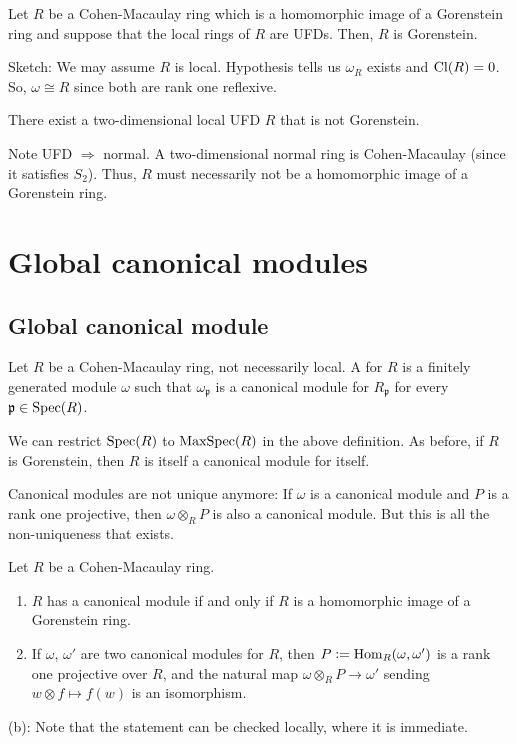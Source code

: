 \documentclass[12pt]{article}
\begin{document}
\begin{thm}[Murthy]
	Let $R$ be a Cohen-Macaulay ring which is a homomorphic image of a Gorenstein ring and suppose that the local rings of $R$ are UFDs. Then, $R$ is Gorenstein.
\end{thm}
Sketch: We may assume $R$ is local. Hypothesis tells us $\omega_{R}$ exists and $\operatorname{Cl}(R) = 0$. So, $\omega \cong R$ since both are rank one reflexive. 

\begin{rem}
	There exist a two-dimensional local UFD $R$ that is not Gorenstein. 

	Note UFD $\Rightarrow$ normal. A two-dimensional normal ring is Cohen-Macaulay (since it satisfies $S_{2}$). Thus, $R$ must necessarily not be a homomorphic image of a Gorenstein ring.
\end{rem}

\section{Global canonical modules}

\subsection{Global canonical module}
\begin{defn}
	Let $R$ be a Cohen-Macaulay ring, not necessarily local. A  for $R$ is a finitely generated module $\omega$ such that $\omega_{\mathfrak{p}}$ is a canonical module for $R_{\mathfrak{p}}$ for every $\mathfrak{p} \in \operatorname{Spec}(R)$.
\end{defn}
We can restrict $\operatorname{Spec}(R)$ to $\operatorname{MaxSpec}(R)$ in the above definition. As before, if $R$ is Gorenstein, then $R$ is itself a canonical module for itself. 

Canonical modules are not unique anymore: If $\omega$ is a canonical module and $P$ is a rank one projective, then $\omega \otimes_{R} P$ is also a canonical module. But this is all the non-uniqueness that exists.

\begin{thm}
	Let $R$ be a Cohen-Macaulay ring.
	\begin{enumerate}[label=(\alph*)]
		\item $R$ has a canonical module if and only if $R$ is a homomorphic image of a Gorenstein ring.
		\item If $\omega$, $\omega'$ are two canonical modules for $R$, then $P \vcentcolon= \operatorname{Hom}_{R}(\omega, \omega')$ is a rank one projective over $R$, and the natural map $\omega \otimes_{R} P \to \omega'$ sending $w \otimes f \mapsto f(w)$ is an isomorphism.
	\end{enumerate}
\end{thm}
(b): Note that the statement can be checked locally, where it is immediate.
\end{document}
